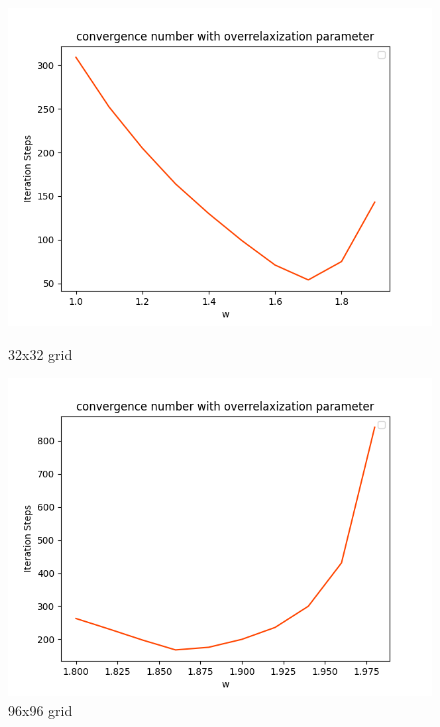 \documentclass[12pt]{article}
\begin{document}
\begin{figure}[H]
    \centering
    \begin{minipage}{0.45\textwidth}
        \includegraphics[width=\linewidth]{4cyws32.png}
        \caption{32x32 grid}
        \label{fig:32grid}
    \end{minipage}
    \hfill
    \begin{minipage}{0.45\textwidth}
        \includegraphics[width=\linewidth]{4cy96grid0.02w.png}
        \caption{96x96 grid}
        \label{fig:96grid}
    \end{minipage}

    \vspace{1em} %


\end{figure}
\end{document}
